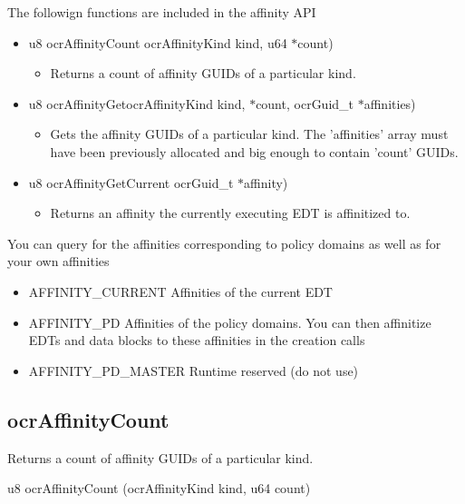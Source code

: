The followign functions are included in the affinity API
\begin{itemize}
\item
{u8} {ocr\-Affinity\-Count} {ocr\-Affinity\-Kind} kind, {u64} $\ast$count)
\begin{itemize}
\item Returns a count of affinity G\-U\-I\-Ds of a particular kind.
\end{itemize}

\item
{u8} {ocr\-Affinity\-Get}{ocr\-Affinity\-Kind} kind, $\ast$count, {ocr\-Guid\-\_\-t} $\ast$affinities)
\begin{itemize}
\item Gets the affinity G\-U\-I\-Ds of a particular kind. The 'affinities' array must have been previously
allocated and big enough to contain 'count' G\-U\-I\-Ds.
\end{itemize}

\item
{u8} {ocr\-Affinity\-Get\-Current} {ocr\-Guid\-\_\-t} $\ast$affinity)
\begin{itemize}
\item Returns an affinity the currently executing E\-D\-T is affinitized to.
\end{itemize}
\end{itemize}


You can query for the affinities corresponding to policy domains as well as for your own affinities
\begin{itemize}
\item
{A\-F\-F\-I\-N\-I\-T\-Y\-\_\-\-C\-U\-R\-R\-E\-N\-T} Affinities of the current E\-D\-T
\item
{A\-F\-F\-I\-N\-I\-T\-Y\-\_\-\-P\-D}
Affinities of the policy domains. You can then affinitize E\-D\-Ts and data blocks to these affinities in the creation calls

\item
{A\-F\-F\-I\-N\-I\-T\-Y\-\_\-\-P\-D\-\_\-\-M\-A\-S\-T\-E\-R}
Runtime reserved (do not use)
\end{itemize}


\subsection{ocr\-Affinity\-Count}
\summary
Returns a count of affinity G\-U\-I\-Ds of a particular kind.

\begin{boxedcode}
u8 ocrAffinityCount (ocrAffinityKind kind, u64 \*count)
\end{boxedcode}


